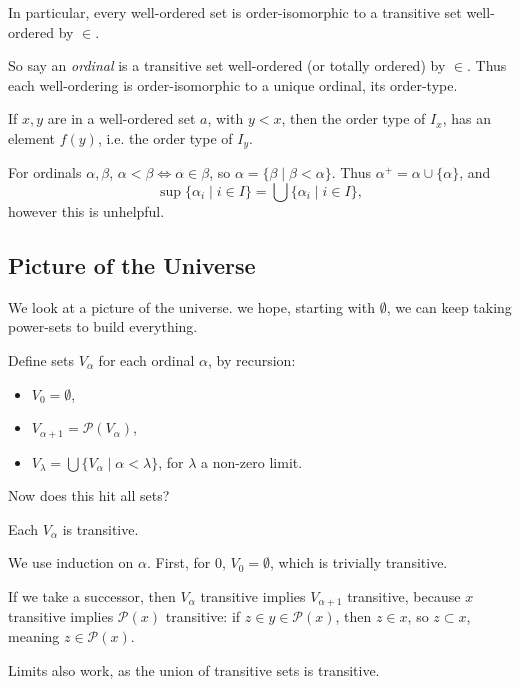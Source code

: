 \documentclass[12pt]{article}
\begin{document}
In particular, every well-ordered set is order-isomorphic to a transitive set well-ordered by $\in$.

So say an \emph{ordinal} is a transitive set well-ordered (or totally ordered) by $\in$. Thus each well-ordering is order-isomorphic to a unique ordinal, its order-type.

If $x, y$ are in a well-ordered set $a$, with $y < x$, then the order type of $I_x$, has an element $f(y)$, i.e. the order type of $I_y$.

For ordinals $\alpha, \beta$, $\alpha < \beta \iff \alpha \in \beta$, so $\alpha = \{\beta \mid \beta < \alpha\}$. Thus $\alpha^{+} = \alpha \cup \{\alpha\}$, and
\[
	\sup \{\alpha_i \mid i \in I\} = \bigcup \{\alpha_i \mid i \in I\},
\]
however this is unhelpful.

\subsection{Picture of the Universe}
\label{sub:picture_of_the_universe}

We look at a picture of the universe. we hope, starting with $\emptyset$, we can keep taking power-sets to build everything.

Define sets $V_{\alpha}$ for each ordinal $\alpha$, by recursion:
\begin{itemize}
	\item $V_0 = \emptyset$,
	\item $V_{\alpha+1} = \mathcal{P}(V_{\alpha})$,
	\item $V_{\lambda} = \bigcup \{V_{\alpha} \mid \alpha < \lambda\}$, for $\lambda$ a non-zero limit.
\end{itemize}
Now does this hit all sets?

\begin{lemma}
	Each $V_{\alpha}$ is transitive.
\end{lemma}

\begin{proofbox}
	We use induction on $\alpha$. First, for $0$, $V_0 =\emptyset$, which is trivially transitive.

	If we take a successor, then $V_{\alpha}$ transitive implies $V_{\alpha + 1}$ transitive, because $x$ transitive implies $\mathcal{P}(x)$ transitive: if $z \in y \in \mathcal{P}(x)$, then $z \in x$, so $z \subset x$, meaning $z \in \mathcal{P}(x)$.

	Limits also work, as the union of transitive sets is transitive.
\end{proofbox}
\end{document}

